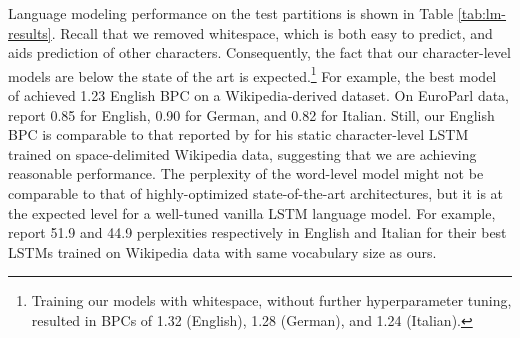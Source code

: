 Language modeling performance on the test partitions is shown in
Table \ref{tab:lm-results}. Recall that we removed whitespace, which
is both easy to predict, and aids prediction of other
characters. Consequently, the fact that our character-level models are
below the state of the art is expected.\footnote{Training our models
  with whitespace, without further hyperparameter tuning, resulted in
  BPCs of 1.32 (English), 1.28 (German), and 1.24 (Italian).}
For example, the best model of  achieved
1.23 English BPC on a Wikipedia-derived dataset. %
On EuroParl data,  report 0.85 for English,
0.90 for German, and 0.82 for Italian. Still, our English BPC is
comparable to that reported by  for his static
character-level LSTM trained on space-delimited Wikipedia data,
suggesting that we are achieving reasonable performance. %
The perplexity of the word-level model might not be comparable to
that of highly-optimized state-of-the-art architectures, but it is at the
expected level for a well-tuned vanilla LSTM language model. For
example,  report 51.9 and 44.9 perplexities respectively in English and Italian for
their best LSTMs trained on Wikipedia data with same vocabulary
size as ours.

